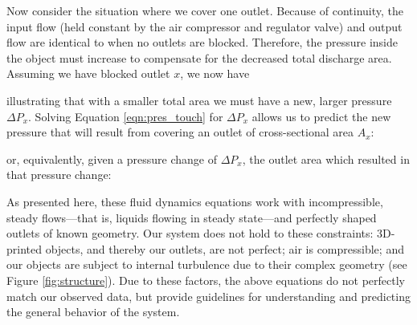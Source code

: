 				Now consider the situation where we cover one outlet. Because of
				continuity, the input flow (held constant by the air compressor and
				regulator valve) and output flow are identical to when no outlets are
				blocked. Therefore, the pressure inside the object must increase to
				compensate for the decreased total discharge area. Assuming we have
				blocked outlet $x$, we now have


				illustrating that with a smaller total area we must have a new, larger
				pressure $\Delta P_x$. Solving Equation \ref{eqn:pres_touch} for $\Delta P_x$
				allows us to predict the new pressure that will result from covering an
				outlet of cross-sectional area $A_x$:


				or, equivalently, given a pressure change of $\Delta P_x$, the outlet area
				which resulted in that pressure change:

				
				As presented here, these fluid dynamics equations work with
				incompressible, steady flows---that is, liquids flowing in steady
				state---and perfectly shaped outlets of known geometry. Our system does
				not hold to these constraints: 3D-printed objects, and thereby our
				outlets, are not perfect; air is compressible; and our objects are subject
				to internal turbulence due to their complex geometry (see
				Figure \ref{fig:structure}). Due to these factors, the above equations do not
				perfectly match our observed data, but provide guidelines for
				understanding and predicting the general behavior of the system.

